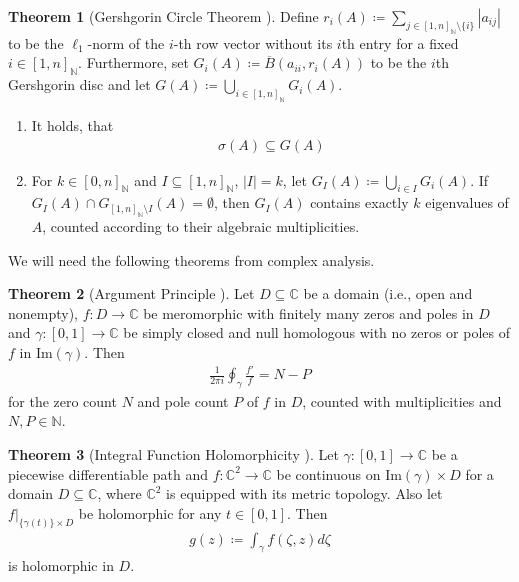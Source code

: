 \documentclass[10pt]{amsart}
\theoremstyle{definition}
\newtheorem{theorem}{Theorem}
\theoremstyle{remark}
\begin{document}
    \begin{theorem}[Gershgorin Circle Theorem {\cite[pp. 387-389]{Horn}}] \label{gershgorin_circle_theorem}
        Define \(r_i(A) \coloneqq \sum_{j \in [1, n]_{\mathbb{N}} \setminus \{i\}} |a_{ij}|\) to be the \(\ell_1\)-norm of the \(i\)-th row vector without its \(i\)th entry for a fixed \(i \in [1, n]_{\mathbb{N}}\). Furthermore, set \(G_i(A) \coloneqq \overline{B}(a_{ii}, r_i(A))\) to be the \(i\)th Gershgorin disc and let \(G(A) \coloneqq \bigcup_{i \in [1, n]_{\mathbb{N}}} G_i(A)\).
        \begin{enumerate}[label=(\roman*), wide]
            \item \label{gershgorin_circle_theorem_1} It holds, that
            \begin{align}
                \sigma(A) \subseteq G(A)
            \end{align}
            \item \label{gershgorin_circle_theorem_2} For \(k \in [0, n]_{\mathbb{N}}\) and \(I \subseteq [1, n]_{\mathbb{N}}\), \(|I| = k\), let \(G_I(A) \coloneqq \bigcup_{i \in I} G_i(A)\). If \(G_I(A) \cap G_{[1, n]_{\mathbb{N}} \setminus I}(A) = \emptyset\), then \(G_I(A)\) contains exactly \(k\) eigenvalues of \(A\), counted according to their algebraic multiplicities.
        \end{enumerate}
    \end{theorem}

    We will need the following theorems from complex analysis.

    \begin{theorem}[{Argument Principle \cite[p. 350]{Remmert}}] \label{argument_principle}
        Let \(D \subseteq \mathbb{C}\) be a domain (i.e., open and nonempty), \(f\colon D \to \mathbb{C}\) be meromorphic with finitely many zeros and poles in \(D\) and \(\gamma\colon [0, 1] \to \mathbb{C}\) be simply closed and null homologous with no zeros or poles of \(f\) in \(\text{Im}(\gamma)\). Then
        \begin{align}
            \frac{1}{2 \pi i} \oint_\gamma \frac{f'}{f} = N - P
        \end{align}
        for the zero count \(N\) and pole count \(P\) of \(f\) in \(D\), counted with multiplicities and \(N, P \in \mathbb{N}\).
    \end{theorem}

    \begin{theorem}[{Integral Function Holomorphicity \cite[pp. 212-213]{Remmert}}] \label{two_variable_holomorphicity}
        Let \(\gamma\colon [0, 1] \to \mathbb{C}\) be a piecewise differentiable path and \(f\colon \mathbb{C}^2 \to \mathbb{C}\) be continuous on \(\text{Im}(\gamma) \times D\) for a domain \(D \subseteq \mathbb{C}\), where \(\mathbb{C}^2\) is equipped with its metric topology. Also let \(f|_{\{\gamma(t)\} \times D}\) be holomorphic for any \(t \in [0, 1]\). Then
        \begin{align}
            g(z) \coloneqq \int_\gamma f(\zeta, z) d \zeta
        \end{align}
        is holomorphic in \(D\).
    \end{theorem}
\end{document}

